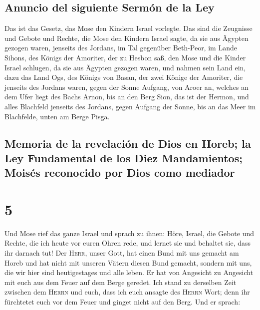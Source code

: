 \hypertarget{anuncio-del-siguiente-sermuxf3n-de-la-ley}{%
\subsection{Anuncio del siguiente Sermón de la
Ley}\label{anuncio-del-siguiente-sermuxf3n-de-la-ley}}

 Das ist das Gesetz, das Mose den Kindern Israel
vorlegte.  Das sind die Zeugnisse und Gebote und Rechte,
die Mose den Kindern Israel sagte, da sie aus Ägypten gezogen waren,
 jenseits des Jordans, im Tal gegenüber Beth-Peor, im
Lande Sihons, des Königs der Amoriter, der zu Hesbon saß, den Mose und
die Kinder Israel schlugen, da sie aus Ägypten gezogen waren,
 und nahmen sein Land ein, dazu das Land Ogs, des Königs
von Basan, der zwei Könige der Amoriter, die jenseits des Jordans waren,
gegen der Sonne Aufgang,  von Aroer an, welches an dem
Ufer liegt des Bachs Arnon, bis an den Berg Sion, das ist der Hermon,
 und alles Blachfeld jenseits des Jordans, gegen Aufgang
der Sonne, bis an das Meer im Blachfelde, unten am Berge Pisga.

\hypertarget{memoria-de-la-revelaciuxf3n-de-dios-en-horeb-la-ley-fundamental-de-los-diez-mandamientos-moisuxe9s-reconocido-por-dios-como-mediador}{%
\subsection{Memoria de la revelación de Dios en Horeb; la Ley
Fundamental de los Diez Mandamientos; Moisés reconocido por Dios como
mediador}\label{memoria-de-la-revelaciuxf3n-de-dios-en-horeb-la-ley-fundamental-de-los-diez-mandamientos-moisuxe9s-reconocido-por-dios-como-mediador}}

\hypertarget{section-4}{%
\section{5}\label{section-4}}

 Und Mose rief das ganze Israel und sprach zu ihnen: Höre,
Israel, die Gebote und Rechte, die ich heute vor euren Ohren rede, und
lernet sie und behaltet sie, dass ihr darnach tut!  Der
\textsc{Herr}, unser Gott, hat einen Bund mit uns gemacht am Horeb
 und hat nicht mit unseren Vätern diesen Bund gemacht,
sondern mit uns, die wir hier sind heutigestages und alle leben.
 Er hat von Angesicht zu Angesicht mit euch aus dem Feuer
auf dem Berge geredet.  Ich stand zu derselben Zeit
zwischen dem \textsc{Herrn} und euch, dass ich euch ansagte des
\textsc{Herrn} Wort; denn ihr fürchtetet euch vor dem Feuer und ginget
nicht auf den Berg. Und er sprach:

